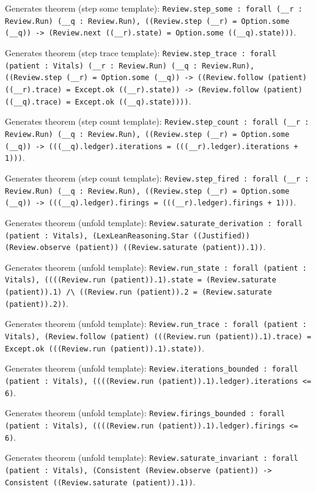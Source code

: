 \documentclass[11pt]{article}
\begin{document}
\noindent Generates theorem (step some template): \texttt{Review.step\_some : forall (\_\_r : Review.Run) (\_\_q : Review.Run), ((Review.step (\_\_r) = Option.some (\_\_q)) -> (Review.next ((\_\_r).state) = Option.some ((\_\_q).state)))}.\par
\noindent Generates theorem (step trace template): \texttt{Review.step\_trace : forall (patient : Vitals) (\_\_r : Review.Run) (\_\_q : Review.Run), ((Review.step (\_\_r) = Option.some (\_\_q)) -> ((Review.follow (patient) ((\_\_r).trace) = Except.ok ((\_\_r).state)) -> (Review.follow (patient) ((\_\_q).trace) = Except.ok ((\_\_q).state))))}.\par
\noindent Generates theorem (step count template): \texttt{Review.step\_count : forall (\_\_r : Review.Run) (\_\_q : Review.Run), ((Review.step (\_\_r) = Option.some (\_\_q)) -> (((\_\_q).ledger).iterations = (((\_\_r).ledger).iterations + 1)))}.\par
\noindent Generates theorem (step count template): \texttt{Review.step\_fired : forall (\_\_r : Review.Run) (\_\_q : Review.Run), ((Review.step (\_\_r) = Option.some (\_\_q)) -> (((\_\_q).ledger).firings = (((\_\_r).ledger).firings + 1)))}.\par
\noindent Generates theorem (unfold template): \texttt{Review.saturate\_derivation : forall (patient : Vitals), (LexLeanReasoning.Star ((Justified)) (Review.observe (patient)) ((Review.saturate (patient)).1))}.\par
\noindent Generates theorem (unfold template): \texttt{Review.run\_state : forall (patient : Vitals), ((((Review.run (patient)).1).state = (Review.saturate (patient)).1) /\textbackslash{} ((Review.run (patient)).2 = (Review.saturate (patient)).2))}.\par
\noindent Generates theorem (unfold template): \texttt{Review.run\_trace : forall (patient : Vitals), (Review.follow (patient) (((Review.run (patient)).1).trace) = Except.ok (((Review.run (patient)).1).state))}.\par
\noindent Generates theorem (unfold template): \texttt{Review.iterations\_bounded : forall (patient : Vitals), ((((Review.run (patient)).1).ledger).iterations <= 6)}.\par
\noindent Generates theorem (unfold template): \texttt{Review.firings\_bounded : forall (patient : Vitals), ((((Review.run (patient)).1).ledger).firings <= 6)}.\par
\noindent Generates theorem (unfold template): \texttt{Review.saturate\_invariant : forall (patient : Vitals), (Consistent (Review.observe (patient)) -> Consistent ((Review.saturate (patient)).1))}.\par
\end{document}
